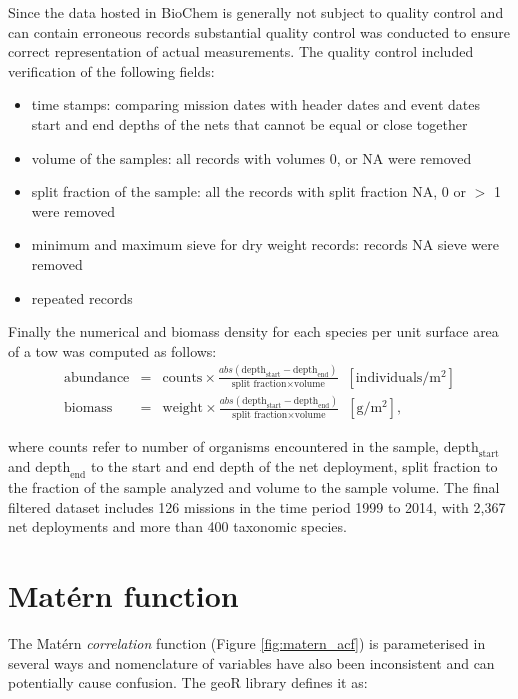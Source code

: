 \documentclass[letterpaper,portrait,11pt]{scrartcl}
\numberwithin{equation}{section}    %
\numberwithin{figure}{section}    %
\numberwithin{table}{section}       %
\begin{document}
\begin{appendices}
Since the data hosted in BioChem is generally not subject to quality control and can contain erroneous records substantial quality control was conducted to ensure correct representation of actual measurements. The quality control included verification of the following fields: 

\begin{itemize}
  \item time stamps: comparing mission dates with header dates and event dates 
  start and end depths of the nets that cannot be equal or close together
  \item volume of the samples: all records with volumes 0, or NA were removed
  \item split fraction of the sample: all the records with split fraction NA, 0 or $>$ 1 were removed 
  \item minimum and maximum sieve for dry weight records: records NA sieve were removed
  \item repeated records 
\end{itemize}


Finally the numerical and biomass density for each species per unit surface area of a tow was computed as follows: 
\begin{eqnarray*}
\text{abundance} &=& \text{counts} \times \frac{  abs( \text{depth}_{\text{start}} - \text{depth}_{\text{end}} ) } { \text{split fraction} \times \text{volume} } \; \; [\text{individuals}/ \text{m}^{2} ]  \\
\text{biomass} &=& \text{weight} \times \frac{ abs( \text{depth}_{\text{start}} - \text{depth}_{\text{end}} )} { \text{split fraction} \times \text{volume}} \; \; [\text{g}/\text{m}^2],
\end{eqnarray*}

where counts refer to number of organisms encountered in the sample, $\text{depth}_{\text{start}}$ and $\text{depth}_{\text{end}}$ to the start and end depth of the net deployment, split fraction to the fraction of the sample analyzed and volume to the sample volume. The final filtered dataset includes 126 missions in the time period 1999 to 2014, with 2,367 net deployments and more than 400 taxonomic species. 

\section{Mat\'{e}rn function}
\label{sec:matern}

The Mat\'{e}rn \textit{correlation} function (Figure \ref{fig:matern_acf}) is parameterised in several ways and nomenclature of variables have also been inconsistent and can potentially cause confusion. The geoR library \parencite{diggle:2007, ribeiro:2001} defines it as:


\end{appendices}
\end{document}
